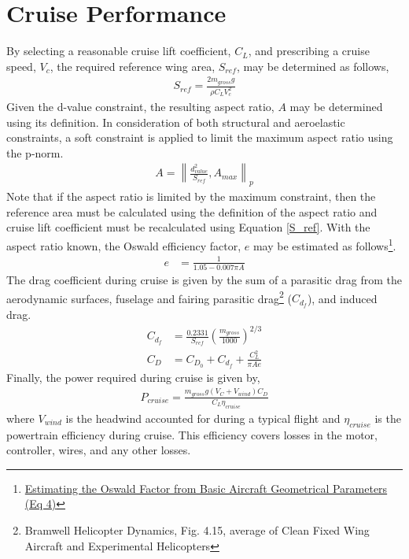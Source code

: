 \documentclass[12pt, letter]{article}
\begin{document}
\section{Cruise Performance}
By selecting a reasonable cruise lift coefficient, $C_L$, and prescribing a cruise speed, $V_c$, the required reference wing area, $S_{ref}$, may be determined as follows,
\begin{align}
	S_{ref}=\frac{2m_{gross}g}{\rho C_L V_c^2} \label{S_ref}
\end{align}
Given the d-value constraint, the resulting aspect ratio, $A$ may be determined using its definition. In consideration of both structural and aeroelastic constraints, a soft constraint is applied to limit the maximum aspect ratio using the p-norm.
\begin{align}
	A=\left\|\frac{d_{value}^2}{S_{ref}},A_{max}\right\|_p
\end{align}
Note that if the aspect ratio is limited by the maximum constraint, then the reference area must be calculated using the definition of the aspect ratio and cruise lift coefficient must be recalculated using Equation \ref{S_ref}. With the aspect ratio known, the Oswald efficiency factor, $e$ may be estimated as follows\footnote{\href{https://bit.ly/2BhwcbZ}{Estimating the Oswald Factor from Basic Aircraft Geometrical Parameters (Eq 4)}}.
\begin{align}
	e &=\frac{1}{1.05-0.007 \pi A}
\end{align}
The drag coefficient during cruise is given by the sum of a parasitic drag from the aerodynamic surfaces, fuselage and fairing parasitic drag\footnote{Bramwell Helicopter Dynamics, Fig. 4.15, average of Clean Fixed Wing Aircraft and Experimental Helicopters} ($C_{d_f}$), and induced drag.
\begin{align}
	C_{d_f}&=\frac{0.2331}{S_{ref}} \left(\frac{m_{gross}}{1000}\right)^{2/3}\\
	C_D&=C_{D_0}+C_{d_f}+\frac{C_L^2}{\pi A e}
\end{align}
Finally, the power required during cruise is given by,
\begin{align}
	P_{cruise} = \frac{m_{gross} g \left(V_C + V_{wind}\right) C_D}{C_L \eta_{cruise}}
\end{align}
where $V_{wind}$ is the headwind accounted for during a typical flight and $\eta_{cruise}$ is the powertrain efficiency during cruise. This efficiency covers losses in the motor, controller, wires, and any other losses.
\end{document}
